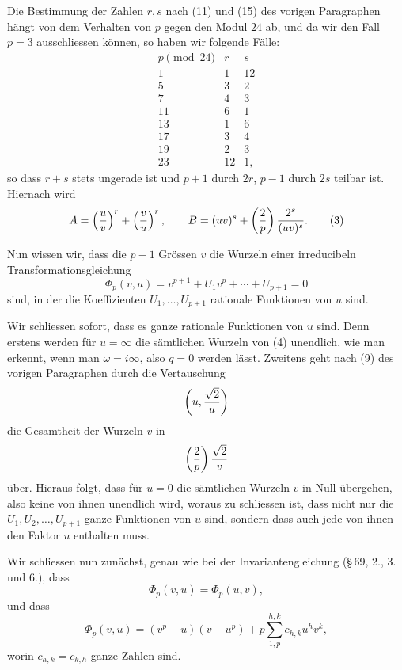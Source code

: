 \documentclass[11pt]{article}
\begin{document}
Die Bestimmung der Zahlen $r,s$ nach (11) und (15) des vorigen Paragraphen hängt von dem Verhalten von $p$ gegen den Modul $24$ ab, und da wir den Fall $p=3$ ausschliessen können, so haben wir folgende Fälle:
\begin{equation}
\begin{array}{c|cc}
 p\pmod{24} & r & s\\
\hline
 1  & 1  & 12\\
 5  & 3  & 2\\
 7  & 4  & 3\\
 11 & 6  & 1\\
 13 & 1  & 6\\
 17 & 3  & 4\\
 19 & 2  & 3\\
 23 & 12 & 1,
\end{array}
\tag{2}
\end{equation}
so dass $r+s$ stets ungerade ist und $p+1$ durch $2r$, $p-1$ durch $2s$ teilbar ist. Hiernach wird
\begin{equation}
 A=\left({u\over v}\right)^r+\left({v\over u}\right)^r,
 \qquad
 B=(uv)^s+\left({2\over p}\right){2^s\over(uv)^s}.
\tag{3}
\end{equation}

Nun wissen wir, dass die $p-1$ Grössen $v$ die Wurzeln einer irreducibeln Transformationsgleichung
\begin{equation}
 \Phi_p(v,u)=v^{p+1}+U_1v^p+\cdots+U_{p+1}=0
\tag{4}
\end{equation}
sind, in der die Koeffizienten $U_1,\ldots,U_{p+1}$ rationale Funktionen von $u$ sind.

Wir schliessen sofort, dass es ganze rationale Funktionen von $u$ sind. Denn erstens werden für $u=\infty$ die sämtlichen Wurzeln von (4) unendlich, wie man erkennt, wenn man $\omega=i\infty$, also $q=0$ werden lässt. Zweitens geht nach (9) des vorigen Paragraphen durch die Vertauschung
\[
 \left(u,{\sqrt2\over u}\right)
\]
die Gesamtheit der Wurzeln $v$ in
\[
 \left({2\over p}\right){\sqrt2\over v}
\]
über. Hieraus folgt, dass für $u=0$ die sämtlichen Wurzeln $v$ in Null übergehen, also keine von ihnen unendlich wird, woraus zu schliessen ist, dass nicht nur die $U_1,U_2,\ldots,U_{p+1}$ ganze Funktionen von $u$ sind, sondern dass auch jede von ihnen den Faktor $u$ enthalten muss.

Wir schliessen nun zunächst, genau wie bei der Invariantengleichung (\S\,69, 2., 3. und 6.), dass
\begin{equation}
 \Phi_p(v,u)=\Phi_p(u,v),
\tag{5}
\end{equation}
und dass
\begin{equation}
 \Phi_p(v,u)=(v^p-u)(v-u^p)
 +p\sum_{1,p}^{h,k}c_{h,k}u^hv^k,
\tag{6}
\end{equation}
worin $c_{h,k}=c_{k,h}$ ganze Zahlen sind.
\end{document}
